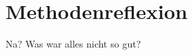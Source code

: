\documentclass[../Abschlussarbeit.tex]{subfiles}
\begin{document}
\section{Methodenreflexion}
Na? Was war alles nicht so gut?
\end{document}
